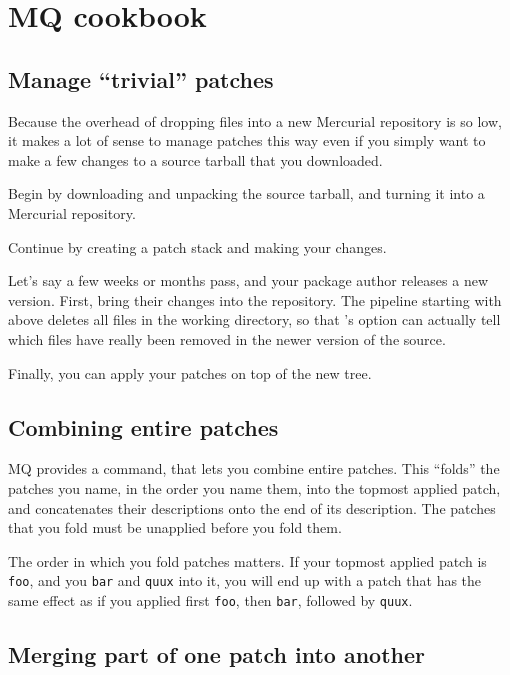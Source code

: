 \section{MQ cookbook}

\subsection{Manage ``trivial'' patches}

Because the overhead of dropping files into a new Mercurial repository
is so low, it makes a lot of sense to manage patches this way even if
you simply want to make a few changes to a source tarball that you
downloaded.

Begin by downloading and unpacking the source tarball,
and turning it into a Mercurial repository.

Continue by creating a patch stack and making your changes.

Let's say a few weeks or months pass, and your package author releases
a new version.  First, bring their changes into the repository.
The pipeline starting with  above deletes all files in
the working directory, so that 's
 option can actually tell which files have
really been removed in the newer version of the source.

Finally, you can apply your patches on top of the new tree.

\subsection{Combining entire patches}
\label{sec:mq:combine}

MQ provides a command,  that lets you combine entire
patches.  This ``folds'' the patches you name, in the order you name
them, into the topmost applied patch, and concatenates their
descriptions onto the end of its description.  The patches that you
fold must be unapplied before you fold them.

The order in which you fold patches matters.  If your topmost applied
patch is \texttt{foo}, and you  \texttt{bar} and
\texttt{quux} into it, you will end up with a patch that has the same
effect as if you applied first \texttt{foo}, then \texttt{bar},
followed by \texttt{quux}.

\subsection{Merging part of one patch into another}

